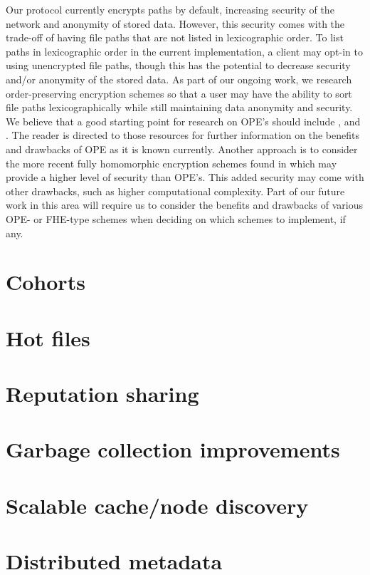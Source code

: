 \documentclass[11pt,fleqn,openany]{book}
\begin{document}
Our protocol currently encrypts paths by default, 
increasing security of the network and anonymity of stored data. 
However, this security comes with the trade-off of having file paths 
that are not listed in lexicographic order. 
To list paths in lexicographic order in the current implementation, 
a client may opt-in to using unencrypted file paths, 
though this has the potential to decrease security 
and/or anonymity of the stored data. 
As part of our ongoing work, 
we research 
order-preserving encryption schemes 
\cite{Agrawal:2004:OPE:1007568.1007632} so that a user may have 
the ability to sort file paths lexicographically 
while still maintaining data anonymity and security. 
We believe that a good starting point for research on OPE's 
should include \cite{7815719}, and \cite{10.1007/978-3-642-22792-9_33}. 
The reader is directed to those resources for further information 
on the benefits and drawbacks of OPE as it is known currently. 
Another approach is to consider the more recent fully 
homomorphic encryption schemes found in \cite{gentry2015fully}
which may provide a higher level of security than OPE's. 
This added security may come with other drawbacks, 
such as higher computational complexity. 
Part of our future work in this area will require us to consider
the benefits and drawbacks of various OPE- or FHE-type schemes 
when deciding on which schemes to implement, if any.

\section{Cohorts}
\section{Hot files}\label{sec:future-hot-files}
\section{Reputation sharing}
\section{Garbage collection improvements}
\section{Scalable cache/node discovery}\label{sec:future-cache}
\section{Distributed metadata}\label{sec:distributed-metadata}
\end{document}

